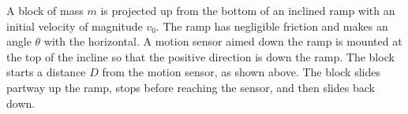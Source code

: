 \documentclass{../../oss-classkick-exam}
\begin{document}
\begin{questions}
\begin{center}
  \end{center}
  \newpage



  \question A block of mass $m$ is projected up from the bottom of an inclined
  ramp with an initial velocity of magnitude $v_0$. The ramp has negligible
  friction and makes an angle $\theta$ with the horizontal. A motion sensor
  aimed down the ramp is mounted at the top of the incline so that the positive
  direction is down the ramp. The block starts a distance $D$ from the motion
  sensor, as shown above. The block slides partway up the ramp, stops before
  reaching the sensor, and then slides back down.
\end{questions}
\end{document}
